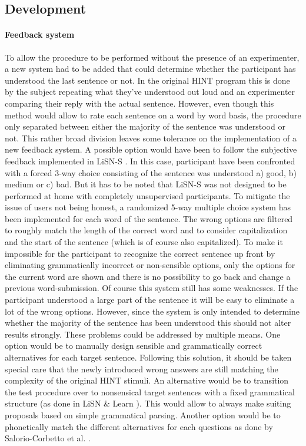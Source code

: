 \documentclass[a4paper,11pt]{article}%
\renewcommand{\\}{\vspace*{0.5\baselineskip} \newline}
\begin{document}
\subsection{Development}

\paragraph{Feedback system} To allow the procedure to be performed without the presence of an experimenter, a new system had to be added that could determine whether the participant has understood the last sentence or not. In the original \ac{HINT} program this is done by the subject repeating what they've understood out loud and an experimenter comparing their reply with the actual sentence. However, even though this method would allow to rate each sentence on a word by word basis, the procedure only separated between either the majority of the sentence was understood or not. This rather broad division leaves some tolerance on the implementation of a new feedback system. A possible option would have been to follow the subjective feedback implemented in \ac{LiSN-S} \cite{Cameron2007}. In this case, participant have been confronted with a forced 3-way choice consisting of the sentence was understood a) good, b) medium or c) bad. But it has to be noted that \ac{LiSN-S} was not designed to be performed at home with completely unsupervised participants. To mitigate the issue of users not being honest, a randomized 5-way multiple choice system has been implemented for each word of the sentence. The wrong options are filtered to roughly match the length of the correct word and to consider capitalization and the start of the sentence (which is of course also capitalized). To make it impossible for the participant to recognize the correct sentence up front by eliminating grammatically incorrect or non-sensible options, only the options for the current word are shown and there is no possibility to go back and change a previous word-submission. Of course this system still has some weaknesses. If the participant understood a large part of the sentence it will be easy to eliminate a lot of the wrong options. However, since the system is only intended to determine whether the majority of the sentence has been understood this should not alter results strongly.
\newline
\newline
These problems could be addressed by multiple means. One option would be to manually design sensible and grammatically correct alternatives for each target sentence. Following this solution, it should be taken special care that the newly introduced wrong answers are still matching the complexity of the original \ac{HINT} stimuli. An alternative would be to transition the test procedure over to nonsensical target sentences with a fixed grammatical structure (as done in \ac{LiSN} \& Learn \cite{Cameron2011}). This would allow to always make suiting proposals based on simple grammatical parsing. Another option would be to phonetically match the different alternatives for each questions as done by Salorio-Corbetto et al. \cite{salorioevaluating}.
\end{document}

